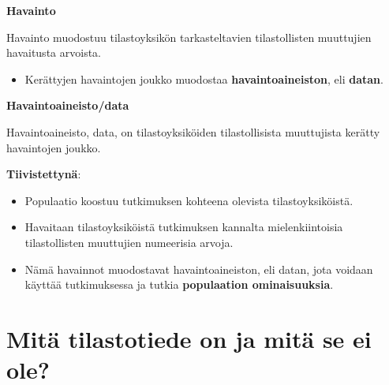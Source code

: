 \documentclass[
]{book}
\providecommand{\tightlist}{%
  \setlength{\itemsep}{0pt}\setlength{\parskip}{0pt}}
\begin{document}
\begin{defblock}{}
\textbf{Havainto}

Havainto muodostuu tilastoyksikön tarkasteltavien tilastollisten muuttujien havaitusta arvoista.

\end{defblock}

\begin{itemize}
\tightlist
\item
  Kerättyjen havaintojen joukko muodostaa \textbf{havaintoaineiston}, eli \textbf{datan}.
\end{itemize}

\begin{defblock}{}
\textbf{Havaintoaineisto/data}

Havaintoaineisto, data, on tilastoyksiköiden tilastollisista muuttujista kerätty havaintojen joukko.

\end{defblock}

\textbf{Tiivistettynä}:

\begin{itemize}
\tightlist
\item
  Populaatio koostuu tutkimuksen kohteena olevista tilastoyksiköistä.
\item
  Havaitaan tilastoyksiköistä tutkimuksen kannalta mielenkiintoisia tilastollisten muuttujien numeerisia arvoja.
\item
  Nämä havainnot muodostavat havaintoaineiston, eli datan, jota voidaan käyttää tutkimuksessa ja tutkia \textbf{populaation ominaisuuksia}.
\end{itemize}

\hypertarget{alaluku32}{%
\section{Mitä tilastotiede on ja mitä se ei ole?}\label{alaluku32}}
\end{document}
